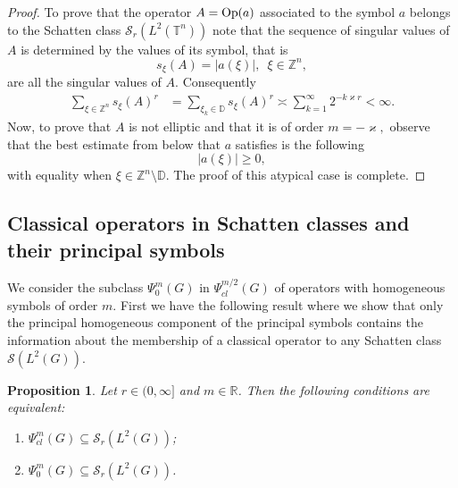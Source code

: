 \documentclass[12pt, reqno]{amsart}
\newtheorem{proposition}[theorem]{Proposition}
\theoremstyle{definition}
\theoremstyle{remark}
\numberwithin{equation}{section}
\begin{document}
\begin{proof}
To prove that the operator $A=\textnormal{Op}(a)$ associated to the symbol $a$ belongs to the Schatten class $\mathscr{S}_{r}(L^2(\mathbb{T}^n))$ note that the sequence of singular values of $A$ is determined by the values of its symbol, that is
\begin{equation}
    s_{\xi}(A)=|a(\xi)|,\,\,\,\xi\in \mathbb{Z}^n,
\end{equation} are all the singular values of $A.$  Consequently
\begin{align*}
    \sum_{\xi\in \mathbb{Z}^n
    }s_\xi(A)^r &=\sum_{\xi_k\in \mathbb{D}} s_\xi(A)^r
\asymp \sum_{k=1}^\infty 2^{-k\varkappa r}<\infty.
\end{align*}Now, to prove that $A$ is not elliptic and that it is of order $m=-\varkappa,$ observe that the best estimate from below that $a$ satisfies is the following
\begin{equation}
    |a(\xi)|\geq 0,
\end{equation}with equality when $\xi\in\mathbb{Z}^n\setminus \mathbb{D}. $ The proof of this atypical case is complete.    
\end{proof}




\subsection{Classical operators in Schatten classes and their principal symbols}\label{Classical:symbols:section}

We consider the subclass $\Psi_0^m(G)$ in  $\Psi_{cl}^{m/2}(G)$  of
operators with homogeneous symbols of
order $m.$  First we have
the following result where we show that only the  principal  homogeneous component of the principal symbols contains the information about the membership of a classical operator to any Schatten class $\mathscr{S}(L^2(G)).$

\begin{proposition}\label{Prop:RedToHom}
Let $r\in (0,\infty ]$ and $m\in \mathbb{R}$. Then
the following conditions are equivalent:
\begin{enumerate}
\item $\Psi ^m_{cl}(G)\subseteq \mathscr{S}_r(L^2(G))$;



\item $\Psi ^m_0(G)\subseteq \mathscr{S}_r(L^2(G))$.
\end{enumerate}
\end{proposition}
\end{document}
